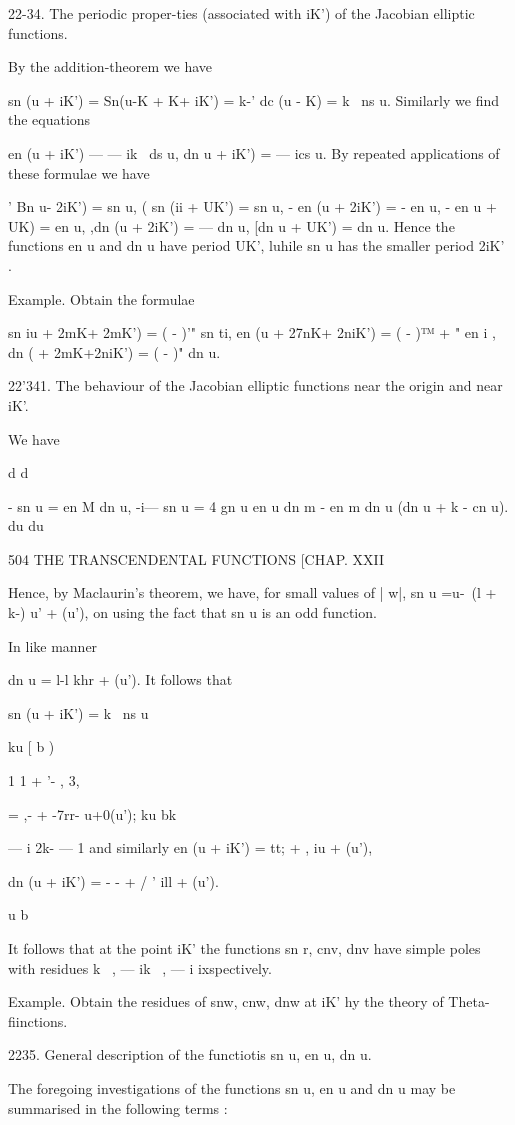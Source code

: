 22-34. The periodic proper-ties (associated with iK') of the Jacobian
elliptic functions.

By the addition-theorem we have

sn (u + iK') = Sn(u-K + K+ iK') = k-' dc (u - K) = k~ ns u. Similarly
we find the equations

en (u + iK') — — ik~ ds u, dn u + iK') = — ics u. By repeated
applications of these formulae we have

' Bn u- 2iK') = sn u, ( sn (ii + UK') = sn u, - en (u + 2iK') = - en
u, - en u + UK) = en u, ,dn (u + 2iK') = — dn u, [dn u + UK') = dn u.
Hence the functions en u and dn u have period UK', luhile sn u has the
smaller period 2iK' .

Example. Obtain the formulae

sn iu + 2mK+ 2mK') = ( - )'" sn ti, en (u + 27nK+ 2niK') = ( - )™ + "
en i , dn ( + 2mK+2niK') = ( - )" dn u.

22'341. The behaviour of the Jacobian elliptic functions near the
origin and near iK'.

We have

d d

- sn u = en M dn u, -i— sn u = 4 gn u en u dn m - en m dn u (dn u + k
- cn u). du du

504 THE TRANSCENDENTAL FUNCTIONS [CHAP. XXII

Hence, by Maclaurin's theorem, we have, for small values of | w|, sn u
=u-~(l + k-) u' + (u'), on using the fact that sn u is an odd
function.

In like manner

dn u = l-l khr + (u'). It follows that

sn (u + iK') = k~ ns u

ku [ b )

1 1 + '- , 3,

= ,- + -7rr- u+0(u'); ku bk

— i 2k- — 1 and similarly en (u + iK') = tt; + , iu + (u'),

dn (u + iK') = - - + / ' ill + (u').

u b

It follows that at the point iK' the functions sn r, cnv, dnv have
simple poles with residues k~ , — ik~ , — i ixspectively.

Example. Obtain the residues of snw, cnw, dnw at iK' hy the theory of
Theta- fiinctions.

2235. General description of the functiotis sn u, en u, dn u.

The foregoing investigations of the functions sn u, en u and dn u may
be summarised in the following terms :


